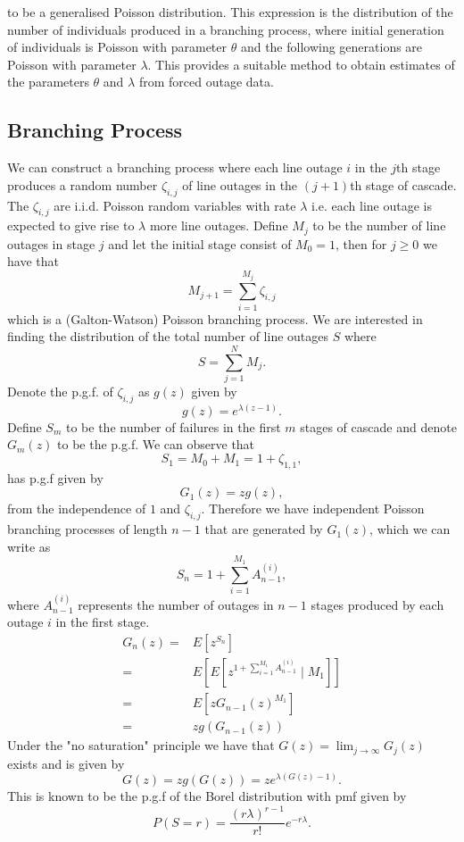 \documentclass{article}
\begin{document}
to be a generalised Poisson distribution. This expression is the distribution of the number of individuals produced in a branching process, where initial generation of individuals is Poisson with parameter $\theta$ and the following generations are Poisson with parameter $\lambda$. This provides a suitable method to obtain estimates of the parameters $\theta$ and $\lambda$ from forced outage data.

\subsection{Branching Process}

We can construct a branching process where each line outage $i$ in the $j$th stage produces a random number $\zeta_{i,j}$ of line outages in the $(j+1)$th stage of cascade. The $\zeta_{i,j}$ are i.i.d. Poisson random variables with rate $\lambda$ i.e. each line outage is expected to give rise to $\lambda$ more line outages. Define $M_j$ to be the number of line outages in stage $j$ and let the initial stage consist of $M_0=1$, then for $j\ge 0$ we have that
\[M_{j+1} = \sum_{i=1}^{M_j} \zeta_{i,j}\]
which is a (Galton-Watson) Poisson branching process. We are interested in finding the distribution of the total number of line outages $S$ where 
\[S = \sum_{j=1}^{N} M_j.\]
Denote the p.g.f. of $\zeta_{i,j}$ as $g(z)$ given by
\[g(z) = e^{\lambda(z-1)}.\]
Define $S_m$ to be the number of failures in the first $m$ stages of cascade and denote $G_m(z)$ to be the p.g.f. We can observe that
\[S_1 = M_0+M_1 = 1+\zeta_{1,1},\]
has p.g.f given by
\[G_1(z) = zg(z),\]	
from the independence of $1$ and $\zeta_{i,j}$. Therefore we have independent Poisson branching processes of length $n-1$ that are generated by $G_1(z)$, which we can write as
\[S_n = 1+ \sum_{i=1}^{M_1} A_{n-1}^{(i)},\]
where $A_{n-1}^{(i)}$ represents the number of outages in $n-1$ stages produced by each outage $i$ in the first stage.
\[\begin{aligned} G_n(z) =& E\left[z^{S_n}\right]\\
=& E\left[ E\left[ z^{1+ \sum_{i=1}^{M_1} A_{n-1}^{(i)}}\mid M_1 \right] \right] \\
=& E\left[ zG_{n-1}(z)^{M_1}\right] \\
=& zg(G_{n-1}(z))
\end{aligned}\]
Under the "no saturation" principle we have that $G(z) = \lim_{j\to \infty} G_j(z)$ exists and is given by
\[G(z) = zg(G(z)) = ze^{\lambda(G(z)-1)}.\]
This is known to be the p.g.f of the Borel distribution with pmf given by
\[P(S=r) = \frac{(r\lambda)^{r-1}}{r!}e^{-r\lambda}.\] \\
\end{document}
